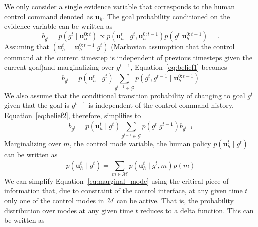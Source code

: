 \documentclass[letterpaper, 10 pt, conference]{ieeeconf}  %
\begin{document}
We only consider a single evidence variable that corresponds to the human control command denoted as $\boldsymbol{u}_h$. The goal probability conditioned on the evidence variable can be written as 
\begin{equation}\label{eq:belief1}
	b_{g^t} = p(g^t \;|\; \boldsymbol{u}_h^{0:t}) \propto p(\boldsymbol{u}_h^t\;|\;g^t,\boldsymbol{u}_h^{0:t-1})p(g^t|\boldsymbol{u}_h^{0:t-1}) \;\;\;\;\;.
\end{equation}
Assuming that $(\boldsymbol{u}_h^t \perp \boldsymbol{u}_h^{0:t-1} | g^t)$ (Markovian assumption that the control command at the current timestep is independent of previous timesteps given the current goal)and marginalizing over $g^{t-1}$, Equation~\ref{eq:belief1} becomes
\begin{equation}\label{eq:belief2}
	b_{g^t} = p(\boldsymbol{u}_h^t \;|\; g^t) \sum_{g^{t-1} \in \mathcal{G}}^{} p(g^t, g^{t-1} \; | \; \boldsymbol{u}_h^{0:t-1})
\end{equation}
We also assume that the conditional transition probability of changing to goal $g^t$ given that the goal is $g^{t-1}$ is independent of the control command history. Equation~\ref{eq:belief2}, therefore, simplifies to
\begin{equation}\label{eq:recursive_belief}
	b_{g^t} = p(\boldsymbol{u}_h^t \;|\; g^t) \sum_{g^{t-1} \in \mathcal{G}}^{} p(g^t | g^{t-1}) b_{g^{t-1}}
\end{equation}
Marginalizing over $m$, the control mode variable, the human policy $p(\boldsymbol{u}_h^t \;|\; g^t)$ can be written as 
\begin{equation} \label{eq:marginal_mode}
	p(\boldsymbol{u}_h^t \;|\; g^t) = \sum_{m \in \mathcal{M}}^{} p(\boldsymbol{u}_h^t \;|\; g^t, m)p(m)
\end{equation}
We can simplify Equation~\ref{eq:marginal_mode} using the critical piece of information that, due to constraint of the control interface, at any given time $t$ only one of the control modes in $\mathcal{M}$ can be active. That is, the probability distribution over modes at any given time $t$ reduces to a delta function. This can be written as
\end{document}
